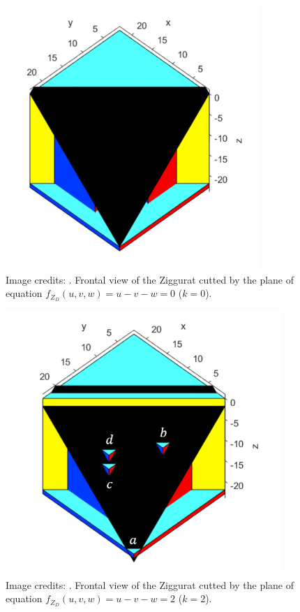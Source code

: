 \documentclass[english, LaM, oneside, noexaminfo]{sapthesis}
\begin{document}
\begin{figure}[tb]
\centering
\includegraphics[height=10cm]{Ziggurat 3D k=0.png}
\caption{Image credits: \cite{student01_my_bachel}. Frontal view of the Ziggurat cutted by the plane of equation $f_{Z_D}(u,v,w) = u-v-w = 0$ ($k=0$).}\label{fig:Ziggurat 3D k=0}
\end{figure}

\begin{figure}[tb]
\centering
\includegraphics[height=10cm]{Ziggurat 3D k=2.png}
\caption{Image credits: \cite{student01_my_bachel}. Frontal view of the Ziggurat cutted by the plane of equation $f_{Z_D}(u,v,w) = u-v-w = 2$ ($k=2$).}\label{fig:Ziggurat 3D k=2}
\end{figure}
\end{document}
